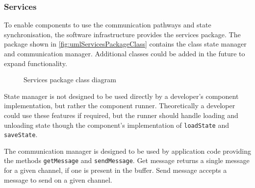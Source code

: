\clearpage

\subsubsection{Services}
To enable components to use the communication pathways and state synchronisation, the software infrastructure provides the services package. The package shown in \autoref{fig:umlServicesPackageClass} contains the class state manager and communication manager. Additional classes could be added in the future to expand functionality.

\begin{figure}[ht]
    \centering
    \caption[Services package class diagram]
    {Services package class diagram}
    \label{fig:umlServicesPackageClass}
\end{figure}

State manager is not designed to be used directly by a developer's component implementation, but rather the component runner. Theoretically a developer could use these features if required, but the runner should handle loading and unloading state though the component's implementation of \verb|loadState| and \verb|saveState|.

The communication manager is designed to be used by application code providing the methods \verb|getMessage| and \verb|sendMessage|. Get message returns a single message for a given channel, if one is present in the buffer. Send message accepts a message to send on a given channel. 

